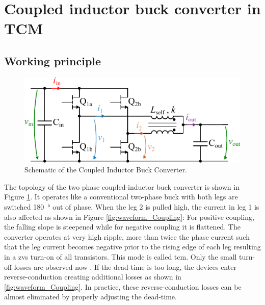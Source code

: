 \documentclass{IPEC2026}
\newcommand{\ac}{\gls}
\newcommand{\acp}{\glspl}
\begin{document}

\section{Coupled inductor buck converter in TCM}
\subsection{Working principle}
\begin{figure} [b]
  \centering
  \includegraphics[width=0.9\columnwidth]{figures/Inkscape/Schematic.pdf}
  \caption{Schematic of the Coupled Inductor Buck Converter.}
  \label{fig:Schematic_BuckConfig_Coupled}
\end{figure}
The topology of the two phase coupled-inductor buck converter is shown in Figure \ref{fig:Schematic_BuckConfig_Coupled}. It operates like a conventional two-phase buck with both legs are switched \qty{180}{\degree} out of phase. When the leg 2 is pulled high, the current in leg 1 is also affected as shown in Figure \ref{fig:waveform_Coupling}: For positive coupling, the falling slope is steepened while for negative coupling it is flattened. The converter operates at very high ripple, more than twice the phase current such that the leg current becomes negative prior to the rising edge of each leg resulting in a \ac{zvs} turn-on of all transistors. This mode is called \ac{tcm}. Only the small turn-off losses are observed now \cite{marxgutInterleavedTriangularCurrent2010}. If the dead-time is too long, the devices enter reverse-conduction creating additional losses as shown in \ref{fig:waveform_Coupling}. In practice, these reverse-conduction losses can be almost eliminated by properly adjusting the dead-time. %
\end{document}
